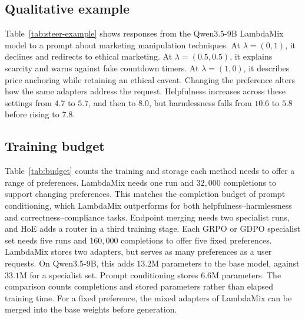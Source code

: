 \documentclass{article} %
\begin{document}
\subsection{Qualitative example}



Table~\ref{tab:steer-example} shows responses from the Qwen3.5-9B LambdaMix model to a prompt about marketing manipulation techniques. At $\lambda=(0,1)$, it declines and redirects to ethical marketing. At $\lambda=(0.5,0.5)$, it explains scarcity and warns against fake countdown timers. At $\lambda=(1,0)$, it describes price anchoring while retaining an ethical caveat. Changing the preference alters how the same adapters address the request. Helpfulness increases across these settings from $4.7$ to $5.7$, and then to $8.0$, but harmlessness falls from $10.6$ to $5.8$ before rising to $7.8$.

\subsection{Training budget}



Table~\ref{tab:budget} counts the training and storage each method needs to offer a range of preferences. LambdaMix needs one run and $32{,}000$ completions to support changing preferences. This matches the completion budget of prompt conditioning, which LambdaMix outperforms for both helpfulness--harmlessness and correctness--compliance tasks. Endpoint merging needs two specialist runs, and HoE adds a router in a third training stage. Each GRPO or GDPO specialist set needs five runs and $160{,}000$ completions to offer five fixed preferences. LambdaMix stores two adapters, but serves as many preferences as a user requests. On Qwen3.5-9B, this adds $13.2$M parameters to the base model, against $33.1$M for a specialist set. Prompt conditioning stores $6.6$M parameters. The comparison counts completions and stored parameters rather than elapsed training time. For a fixed preference, the mixed adapters of LambdaMix can be merged into the base weights before generation. 
\end{document}
